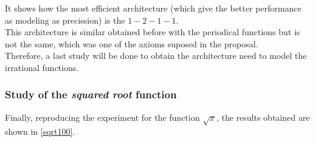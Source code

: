 \documentclass[a4paper, 11pt]{article}
\begin{document}
It shows how the most efficient architecture (which give the better performance as modeling as precission) is the $1-2-1-1$.\\
This architecture is similar obtained before with the periodical functions but is not the same, which was one of the axioms suposed in the proposal.\\
Therefore, a last study will be done to obtain the architecture need to model the irrational functions.
\newpage
\subsubsection{Study of the \textit{squared root} function}
Finally, reproducing the experiment for the function $\sqrt{x}$, the results obtained are shown in \ref{sqrt100}.
\begin{figure}[h]
    \centering
    \hspace{1em}
    \\

\end{figure}
\end{document}
